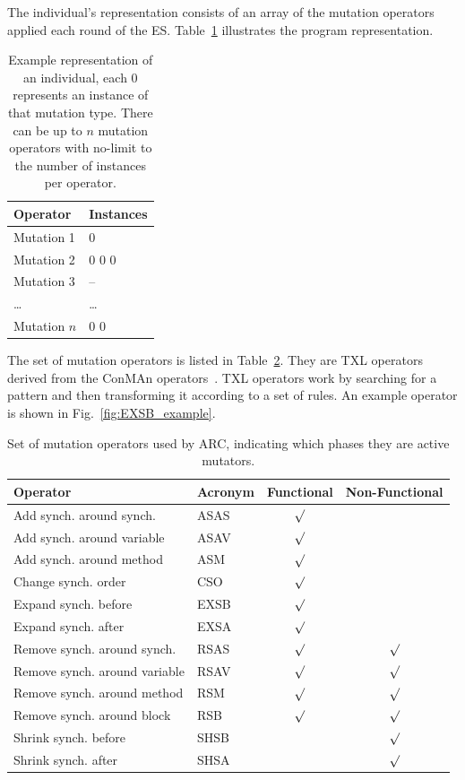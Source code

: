 \documentclass{llncs}
\begin{document}
The individual's representation consists of an array of the mutation operators
applied each round of the ES. Table~\ref{tbl:individual_representation}
illustrates the program representation.

\begin{table}[!h]
\begin{center}
\caption{Example representation of an individual, each 0 represents an instance
of that mutation type. There can be up to $n$ mutation operators with no-limit
to the number of instances per operator.}
\begin{tabular}{|l|l|}
\hline
\textbf{Operator} &
\textbf{Instances}
\\\hline
Mutation 1 & 0
\\\hline
Mutation 2 & 0 0 0
\\\hline
Mutation 3 & --
\\\hline
\ldots & \ldots
\\\hline
Mutation $n$ & 0 0
\\\hline
\end{tabular}
\label{tbl:individual_representation}
\end{center}
\end{table}

The set of mutation operators is listed in Table~\ref{tbl:operators}. They are
TXL operators derived from the ConMAn operators~\cite{BCD06}. TXL operators
work by searching for a pattern and then transforming it according to a set of
rules. An example operator is shown in Fig.~\ref{fig:EXSB_example}.

\begin{table}
\caption{Set of mutation operators used by ARC, indicating which phases they
are active mutators.}
\begin{center}
\begin{tabular}{|l|l|c|c|}
\hline
\textbf{Operator} &
\textbf{Acronym} &
\textbf{Functional} &
\textbf{Non-Functional}
\\\hline
Add synch. around synch. & ASAS & $\surd$ &
\\\hline
Add synch. around variable & ASAV & $\surd$ &
\\\hline
Add synch. around method & ASM & $\surd$ &
\\\hline
Change synch. order & CSO & $\surd$ &
\\\hline
Expand synch. before & EXSB & $\surd$ &
\\\hline
Expand synch. after & EXSA & $\surd$ &
\\\hline
Remove synch. around synch. & RSAS & $\surd$ & $\surd$
\\\hline
Remove synch. around variable & RSAV & $\surd$ & $\surd$
\\\hline
Remove synch. around method & RSM & $\surd$ & $\surd$
\\\hline
Remove synch. around block & RSB & $\surd$ & $\surd$
\\\hline
Shrink synch. before & SHSB & & $\surd$
\\\hline
Shrink synch. after & SHSA & & $\surd$
\\\hline
\end{tabular}
\label{tbl:operators}
\end{center}
\end{table}
\end{document}
